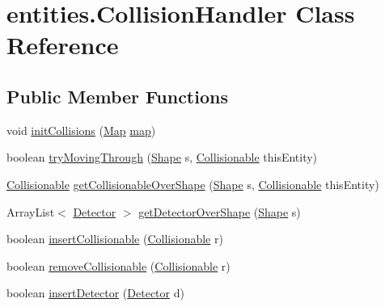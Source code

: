 \hypertarget{classentities_1_1_collision_handler}{}\section{entities.\+Collision\+Handler Class Reference}
\label{classentities_1_1_collision_handler}
\subsection*{Public Member Functions}
\begin{DoxyCompactItemize}
\item 
void \mbox{\hyperlink{classentities_1_1_collision_handler_a7bf0999c216ce86964042ad3e836686e}{init\+Collisions}} (\mbox{\hyperlink{classentities_1_1_map}{Map}} \mbox{\hyperlink{classentities_1_1_collision_handler_a2490d8412bb72d221dd9f68f97565e6f}{map}})
\item 
boolean \mbox{\hyperlink{classentities_1_1_collision_handler_a8aedd2c44d177b1af64be0d7442ec3bb}{try\+Moving\+Through}} (\mbox{\hyperlink{classorg_1_1newdawn_1_1slick_1_1geom_1_1_shape}{Shape}} s, \mbox{\hyperlink{interfaceentities_1_1_collisionable}{Collisionable}} this\+Entity)
\item 
\mbox{\hyperlink{interfaceentities_1_1_collisionable}{Collisionable}} \mbox{\hyperlink{classentities_1_1_collision_handler_a55c5a015e29edac05c725108e3d481f2}{get\+Collisionable\+Over\+Shape}} (\mbox{\hyperlink{classorg_1_1newdawn_1_1slick_1_1geom_1_1_shape}{Shape}} s, \mbox{\hyperlink{interfaceentities_1_1_collisionable}{Collisionable}} this\+Entity)
\item 
Array\+List$<$ \mbox{\hyperlink{interfacedetectors_1_1_detector}{Detector}} $>$ \mbox{\hyperlink{classentities_1_1_collision_handler_ac09d2b1b7fff6e7dd141d09322beb922}{get\+Detector\+Over\+Shape}} (\mbox{\hyperlink{classorg_1_1newdawn_1_1slick_1_1geom_1_1_shape}{Shape}} s)
\item 
boolean \mbox{\hyperlink{classentities_1_1_collision_handler_aa81b3fa6857eeb5d4b2a06aff4dcea87}{insert\+Collisionable}} (\mbox{\hyperlink{interfaceentities_1_1_collisionable}{Collisionable}} r)
\item 
boolean \mbox{\hyperlink{classentities_1_1_collision_handler_a0634abfade22196f7c8292dca6d4c883}{remove\+Collisionable}} (\mbox{\hyperlink{interfaceentities_1_1_collisionable}{Collisionable}} r)
\item 
boolean \mbox{\hyperlink{classentities_1_1_collision_handler_a4f975e65777d79754bab90482b46cf11}{insert\+Detector}} (\mbox{\hyperlink{interfacedetectors_1_1_detector}{Detector}} d)

\end{DoxyCompactItemize}
